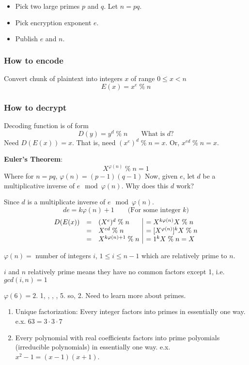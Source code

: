 \begin{itemize}
\item Pick two large primes $p$ and $q$. Let $n = pq$.
\item Pick encryption exponent $e$.
\item Publish $e$ and $n$.
\end{itemize}

\subsubsection*{How to encode} Convert chunk of plaintext into integers $x$ of range $0\leq x < n$
\[
E(x) = x^e\; \%\; n
 \]

\subsubsection*{How to decrypt} Decoding function is of form
\[
D(y) = y^d \;\%\; n \qquad\mbox{What is $d$?}
\]
Need $D(E(x))=x$. That is, need $(x^e)^d \; \%\; n = x$. Or, $x^{ed} \;\%\; n = x$.

\textbf{Euler's Theorem}:
\[
X^{\varphi(n)} \;\%\; n = 1
\]
Where for $n = pq$, $\varphi(n) = (p-1)(q-1)$
Now, given $e$, let $d$ be a multiplicative inverse of $e \mod \varphi(n)$. Why does this $d$ work?

Since $d$ is a multiplicate inverse of $e \mod \varphi(n)$.
\[
de = k\varphi(n) + 1 \qquad\mbox{(For some integer $k$)}
\]
\[ \begin{array}{rcl|l}
D(E(x)) & = & (X^e)^d \;\%\; n		& = X^{k\varphi(n)}X \;\%\; n \\
\hfill    & = & X^{ed} \;\%\; n		& = [X^{\varphi(n)}]^{k}X \;\%\; n \\
\hfill    & = & X^{k\varphi(n) + 1} \;\%\; n	& = 1^k X \;\%\; n = X
\end{array} \]

$\varphi(n) = $ number of integers $i$, $1 \leq i \leq n-1$ which are relatively prime to $n$.

$i$ and $n$ relatively prime means they have no common factors except 1, i.e. $gcd(i,n) =1$

$\varphi(6)=2$. 1, ,  , , 5. so, 2.
Need to learn more about primes.
\begin{enumerate} 
\item Unique factorization: Every integer factors into primes in essentially one way. e.x. $63 = 3 \cdot 3 \cdot 7$
\item Every polynomial with real coefficients factors into prime polyomials (irreducible polynomials) in essentially one way. e.x. $x^2 - 1 = (x-1)(x+1)$.
\end{enumerate}

